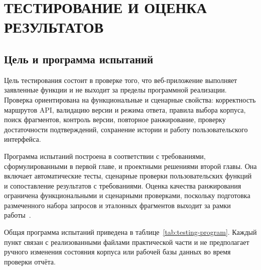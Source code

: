 \chapter{{\fontsize{14pt}{21pt}\selectfont\MakeUppercase{Тестирование и оценка результатов}}}
\label{cha:testing}

\section{Цель и программа испытаний}

Цель тестирования состоит в проверке того, что веб-приложение выполняет заявленные функции и не выходит за пределы программной реализации. Проверка ориентирована на функциональные и сценарные свойства: корректность маршрутов API, валидацию версии и режима ответа, правила выбора корпуса, поиск фрагментов, контроль версии, повторное ранжирование, проверку достаточности подтверждений, сохранение истории и работу пользовательского интерфейса.

Программа испытаний построена в соответствии с требованиями, сформулированными в первой главе, и проектными решениями второй главы. Она включает автоматические тесты, сценарные проверки пользовательских функций и сопоставление результатов с требованиями. Оценка качества ранжирования ограничена функциональными и сценарными проверками, поскольку подготовка размеченного набора запросов и эталонных фрагментов выходит за рамки работы~\cite{manning2008,beizer1990,myers2011}.

Общая программа испытаний приведена в таблице~\ref{tab:testing-program}. Каждый пункт связан с реализованными файлами практической части и не предполагает ручного изменения состояния корпуса или рабочей базы данных во время проверки отчёта.

